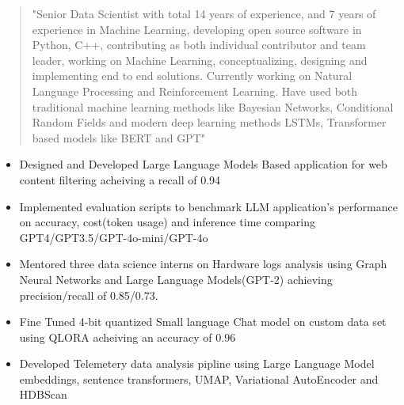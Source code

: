 \documentclass[10pt,a4paper,ragged2e,withhyper]{altacv}
\author{Gaurav Sood}
\date{\today}
\title{}
\begin{document}

\makecvheader

\begin{paracol}{1}
 \begin{quote}
"Senior Data Scientist with total 14 years of experience, and 7 years of experience in Machine Learning, developing open source software in Python, C++, contributing as both individual contributor and team leader, working on Machine Learning, conceptualizing, designing and implementing end to end solutions. Currently working on  Natural Language Processing and Reinforcement Learning. Have used both traditional machine learning methods like Bayesian Networks, Conditional Random Fields and modern deep learning methods LSTMs, Transformer based models like BERT and GPT"
 \end{quote}
\label{sec:org3c4d7c5}


\divider

\divider


\label{sec:orgd49b989}

\begin{itemize}
\item Designed and Developed Large Language Models Based application for web content
filtering acheiving a recall of 0.94
\item Implemented evaluation scripts to benchmark LLM application's performance on
accuracy, cost(token usage) and inference time comparing GPT4/GPT3.5/GPT-4o-mini/GPT-4o
\item Mentored three data science interns on Hardware logs analysis using Graph
Neural Networks and Large Language Models(GPT-2) achieving precision/recall of 0.85/0.73.
\item Fine Tuned 4-bit quantized Small language Chat model on custom data set using QLORA
acheiving an accuracy of 0.96
\item Developed Telemetery data analysis pipline using Large Language Model
embeddings, sentence transformers, UMAP, Variational AutoEncoder and HDBScan
\end{itemize}


\end{paracol}
\end{document}
